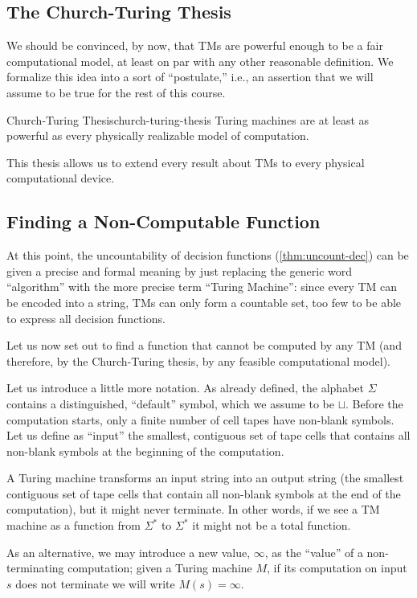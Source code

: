 \subsection{The Church-Turing Thesis}
We should be convinced, by now, that TMs are powerful enough to be a fair computational model, at least on par with any other reasonable definition. We formalize this idea into a sort of ``postulate,'' i.e., an assertion that we will assume to be true for the rest of this course.

\begin{concept}{Church-Turing Thesis}{church-turing-thesis}
    Turing machines are at least as powerful as every physically realizable model of computation.
\end{concept}

\noindent This thesis allows us to extend every result about TMs to every physical computational device.

\subsection{Finding a Non-Computable Function}
At this point, the uncountability of decision functions (\cref{thm:uncount-dec}) can be given a precise and formal meaning by just replacing the generic word ``algorithm'' with the more precise term ``Turing Machine'': since every TM can be encoded into a string, TMs can only form a countable set, too few to be able to express all decision functions.

Let us now set out to find a function that cannot be computed by any TM (and therefore, by the Church-Turing thesis, by any feasible computational model).

Let us introduce a little more notation. As already defined, the alphabet \(\Sigma\) contains a distinguished, ``default'' symbol, which we assume to be \(\sqcup\). Before the computation starts, only a finite number of cell tapes have non-blank symbols. Let us define as ``input'' the smallest, contiguous set of tape cells that contains all non-blank symbols at the beginning of the computation.

A Turing machine transforms an input string into an output string (the smallest contiguous set of tape cells that contain all non-blank symbols at the end of the computation), but it might never terminate. In other words, if we see a TM machine as a function from \(\Sigma^*\) to \(\Sigma^*\) it might not be a total function.

As an alternative, we may introduce a new value, \(\infty\), as the ``value'' of a non-terminating computation; given a Turing machine \(M\), if its computation on input \(s\) does not terminate we will write \(M(s) = \infty\).

